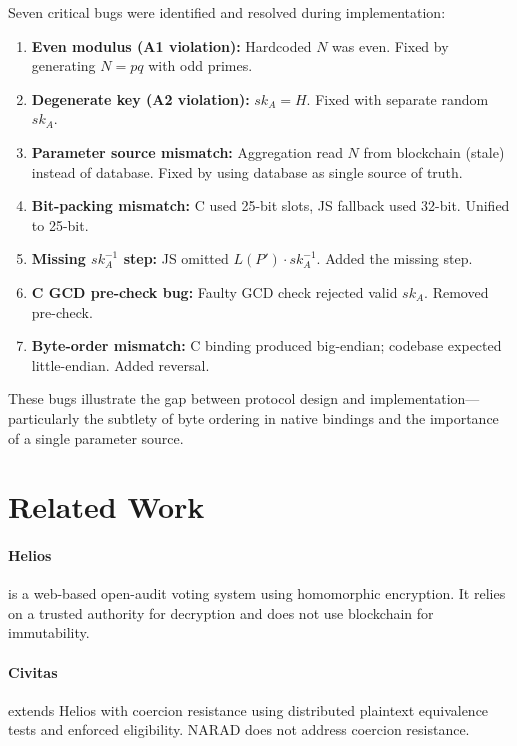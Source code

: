 \documentclass[11pt, a4paper]{article}
\begin{document}
Seven critical bugs were identified and resolved during implementation:

\begin{enumerate}[leftmargin=*]
    \item \textbf{Even modulus (A1 violation):} Hardcoded $N$ was even. Fixed by generating $N = pq$ with odd primes.
    \item \textbf{Degenerate key (A2 violation):} $sk_A = H$. Fixed with separate random $sk_A$.
    \item \textbf{Parameter source mismatch:} Aggregation read $N$ from blockchain (stale) instead of database. Fixed by using database as single source of truth.
    \item \textbf{Bit-packing mismatch:} C used 25-bit slots, JS fallback used 32-bit. Unified to 25-bit.
    \item \textbf{Missing $sk_A^{-1}$ step:} JS omitted $L(P') \cdot sk_A^{-1}$. Added the missing step.
    \item \textbf{C GCD pre-check bug:} Faulty GCD check rejected valid $sk_A$. Removed pre-check.
    \item \textbf{Byte-order mismatch:} C binding produced big-endian; codebase expected little-endian. Added reversal.
\end{enumerate}

These bugs illustrate the gap between protocol design and implementation---particularly the subtlety of byte ordering in native bindings and the importance of a single parameter source.

\section{Related Work}\label{sec:related}

\paragraph{Helios~\cite{adida2008helios}} is a web-based open-audit voting system using homomorphic encryption. It relies on a trusted authority for decryption and does not use blockchain for immutability.

\paragraph{Civitas~\cite{kiayias2008civitas}} extends Helios with coercion resistance using distributed plaintext equivalence tests and enforced eligibility. NARAD does not address coercion resistance.
\end{document}

